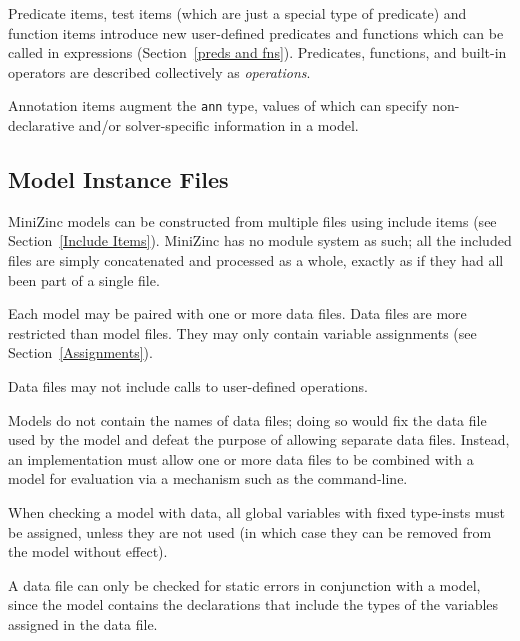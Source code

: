\documentclass[10pt]{scrartcl}
\begin{document}
Predicate items, test items (which are just a special type of predicate)
and function items introduce new user-defined predicates and
functions which can be called in expressions (Section~\ref{preds and fns}).
Predicates, functions, and built-in operators are described collectively as
\emph{operations}.

Annotation items augment the \texttt{ann} type, values of which can specify
non-declarative and/or solver-specific information in a model.

\subsection{Model Instance Files}
     \label{Model Instance Files}
MiniZinc models can be constructed from multiple files using
include items (see Section~\ref{Include Items}).  MiniZinc has no
module system as such;  all the included files are simply concatenated and
processed as a whole, exactly as if they had all been part of a single file.

Each model may be paired with one or more data files.  Data files are more
restricted than model files.  They may only contain variable assignments (see
Section~\ref{Assignments}).

Data files may not include calls to user-defined operations.

Models do not contain the names of data files; doing so would fix the data
file used by the model and defeat the purpose of allowing separate data
files.  Instead, an implementation must allow one or more data files to be
combined with a model for evaluation via a mechanism such as the
command-line.

When checking a model with
data, all global variables with fixed type-insts must be assigned, unless
they are not used (in which case they can be removed from the model without
effect).

A data file can only be checked for static errors in conjunction with a
model, since the model contains the declarations that include the types of
the variables assigned in the data file.
\end{document}
